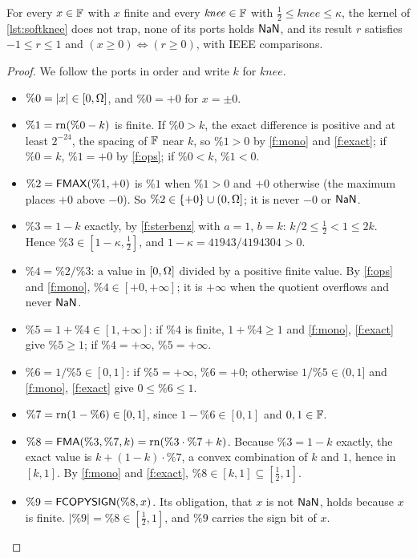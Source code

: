 \begin{theorem}\label{thm:softknee}
For every $x\in\mathbb{F}$ with $x$ finite and every $\mathit{knee}\in\mathbb{F}$ with
$\frac12\le\mathit{knee}\le\kappa$, the kernel of \cref{lst:softknee} does not trap, none of its
ports holds $\mathsf{NaN}$, and its result $r$ satisfies $-1\le r\le1$ and
$(x\ge0)\Leftrightarrow(r\ge0)$, with IEEE comparisons.
\end{theorem}
\begin{proof}
We follow the ports in order and write $k$ for $\mathit{knee}$.
\begin{itemize}
\item $\%0=|x|\in[0,\Omega]$, and $\%0=+0$ for $x=\pm0$.
\item $\%1=\mathrm{rn}(\%0-k)$ is finite. If $\%0>k$, the exact difference is positive and at least
  $2^{-24}$, the spacing of $\mathbb{F}$ near $k$, so $\%1>0$ by \ref{f:mono} and \ref{f:exact}; if
  $\%0=k$, $\%1=+0$ by \ref{f:ops}; if $\%0<k$, $\%1<0$.
\item $\%2=\mbox{\textsf{FMAX}}(\%1,+0)$ is $\%1$ when $\%1>0$ and $+0$ otherwise (the maximum places
  $+0$ above $-0$). So $\%2\in\{+0\}\cup(0,\Omega]$; it is never $-0$ or $\mathsf{NaN}$.
\item $\%3=1-k$ exactly, by \ref{f:sterbenz} with $a=1$, $b=k$: $k/2\le\frac12<1\le2k$. Hence
  $\%3\in[1-\kappa,\frac12]$, and $1-\kappa=41943/4194304>0$.
\item $\%4=\%2/\%3$: a value in $[0,\Omega]$ divided by a positive finite value. By \ref{f:ops}
  and \ref{f:mono}, $\%4\in[+0,+\infty]$; it is $+\infty$ when the quotient overflows and never
  $\mathsf{NaN}$.
\item $\%5=1+\%4\in[1,+\infty]$: if $\%4$ is finite, $1+\%4\ge1$ and \ref{f:mono},
  \ref{f:exact} give $\%5\ge1$; if $\%4=+\infty$, $\%5=+\infty$.
\item $\%6=1/\%5\in[0,1]$: if $\%5=+\infty$, $\%6=+0$; otherwise $1/\%5\in(0,1]$ and
  \ref{f:mono}, \ref{f:exact} give $0\le\%6\le1$.
\item $\%7=\mathrm{rn}(1-\%6)\in[0,1]$, since $1-\%6\in[0,1]$ and $0,1\in\mathbb{F}$.
\item $\%8=\mbox{\textsf{FMA}}(\%3,\%7,k)=\mathrm{rn}(\%3\cdot\%7+k)$. Because $\%3=1-k$ exactly, the exact value is
  $k+(1-k)\cdot\%7$, a convex combination of $k$ and $1$, hence in $[k,1]$. By \ref{f:mono} and
  \ref{f:exact}, $\%8\in[k,1]\subseteq[\frac12,1]$.
\item $\%9=\mbox{\textsf{FCOPYSIGN}}(\%8,x)$. Its obligation, that $x$ is not $\mathsf{NaN}$, holds because $x$ is
  finite. $|\%9|=\%8\in[\frac12,1]$, and $\%9$ carries the sign bit of $x$.

\end{itemize}
\end{proof}
